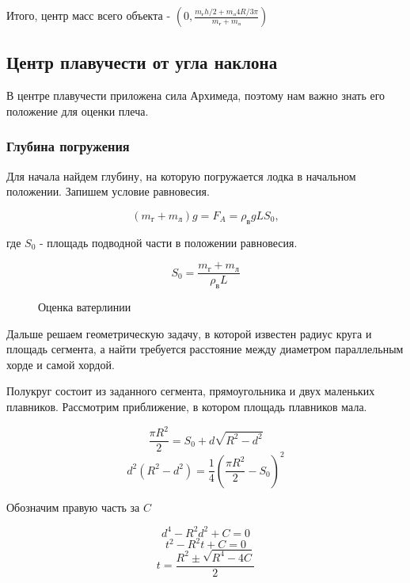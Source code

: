 \documentclass[12pt,a4paper]{article}
\begin{document}
Итого, центр масс всего объекта - $(0, \frac{m_\text{г}h/2 + m_\text{л}4R /3\pi }{m_\text{г} + m_\text{л}})$

\subsection{Центр плавучести от угла наклона}

В центре плавучести приложена сила Архимеда, поэтому нам важно знать его положение для оценки плеча.

\subsubsection{Глубина погружения}
Для начала найдем глубину, на которую погружается лодка в начальном положении. Запишем условие равновесия.

$$ (m_\text{г} + m_\text{л})g = F_A = \rho_\text{в}gLS_0, $$

где $S_0$ - площадь подводной части в положении равновесия.

$$ S_0 = \frac{m_\text{г} + m_\text{л}}{\rho_\text{в}L} $$

\begin{figure}
	\centering
	\caption{Оценка ватерлинии}	
	\label{fig:waterline}
\end{figure}

Дальше решаем геометрическую задачу, в которой известен радиус круга и площадь сегмента, а найти требуется расстояние между диаметром параллельным хорде и самой хордой.

Полукруг состоит из заданного сегмента, прямоугольника и двух маленьких плавников. Рассмотрим приближение, в котором площадь плавников мала.

$$ \frac{\pi R^2}{2} = S_0 + d\sqrt{R^2-d^2} $$
$$ d^2(R^2-d^2) = \frac{1}{4}(\frac{\pi R^2}{2} - S_0)^2 $$

Обозначим правую часть за $C$

$$ d^4 - R^2d^2 + C = 0 $$
$$ t^2 - R^2t + C = 0 $$
$$ t = \frac{R^2 \pm \sqrt{R^4-4C}}{2} $$
\end{document}
